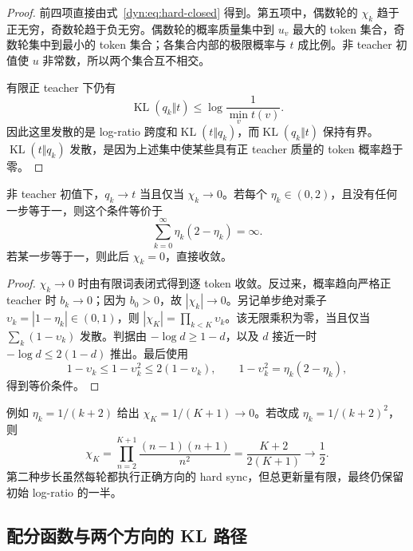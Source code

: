 \documentclass[lang=cn,scheme=chinese,openany]{../book/elegantbook}
\newcommand{\KL}{\operatorname{KL}}
\begin{document}
\begin{proof}
前四项直接由式~\eqref{dyn:eq:hard-closed} 得到。第五项中，偶数轮的 $\chi_k$ 趋于正无穷，奇数轮趋于负无穷。偶数轮的概率质量集中到 $u_v$ 最大的 token 集合，奇数轮集中到最小的 token 集合；各集合内部的极限概率与 $t$ 成比例。非 teacher 初值使 $u$ 非常数，所以两个集合互不相交。

有限正 teacher 下仍有
\begin{equation*}
 \KL(q_k\Vert t)\leq\log\frac1{\min_vt(v)}.
\end{equation*}
因此这里发散的是 log-ratio 跨度和$\KL(t\Vert q_k)$，而$\KL(q_k\Vert t)$ 保持有界。$\KL(t\Vert q_k)$ 发散，是因为上述集中使某些具有正 teacher 质量的 token 概率趋于零。
\end{proof}

\begin{proposition}[变步长的充要条件]
非 teacher 初值下，$q_k\to t$ 当且仅当 $\chi_k\to0$。若每个 $\eta_k\in(0,2)$，且没有任何一步等于一，则这个条件等价于
\begin{equation*}
 \sum_{k=0}^{\infty}\eta_k(2-\eta_k)=\infty.
\end{equation*}
若某一步等于一，则此后 $\chi_k=0$，直接收敛。
\end{proposition}

\begin{proof}
$\chi_k\to0$ 时由有限词表闭式得到逐 token 收敛。反过来，概率趋向严格正 teacher 时 $b_k\to0$；因为 $b_0>0$，故 $|\chi_k|\to0$。另记单步绝对乘子 $\upsilon_k=|1-\eta_k|\in(0,1)$，则 $|\chi_K|=\prod_{k<K}\upsilon_k$。该无限乘积为零，当且仅当 $\sum_k(1-\upsilon_k)$ 发散。判据由 $-\log d\geq1-d$，以及 $d$ 接近一时 $-\log d\leq2(1-d)$ 推出。最后使用
\begin{equation*}
 1-\upsilon_k\leq1-\upsilon_k^2\leq2(1-\upsilon_k),
 \qquad 1-\upsilon_k^2=\eta_k(2-\eta_k),
\end{equation*}
得到等价条件。
\end{proof}

例如 $\eta_k=1/(k+2)$ 给出 $\chi_K=1/(K+1)\to0$。若改成 $\eta_k=1/(k+2)^2$，则
\begin{equation*}
 \chi_K=\prod_{n=2}^{K+1}\frac{(n-1)(n+1)}{n^2}
 =\frac{K+2}{2(K+1)}\longrightarrow\frac12.
\end{equation*}
第二种步长虽然每轮都执行正确方向的 hard sync，但总更新量有限，最终仍保留初始 log-ratio 的一半。

\subsection{配分函数与两个方向的 KL 路径}
\end{document}
